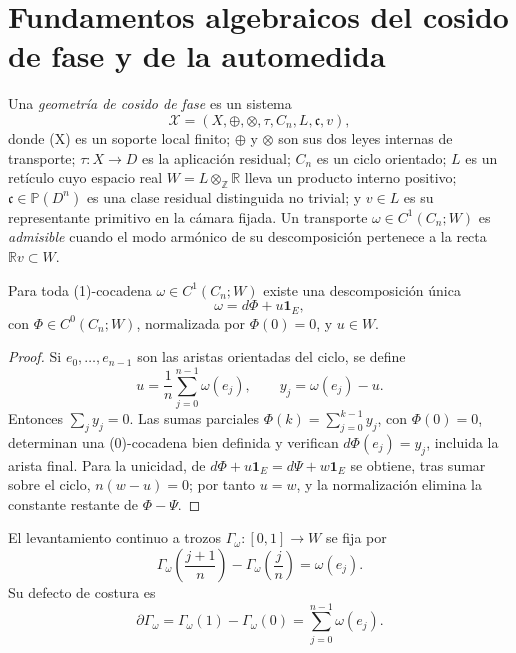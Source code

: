 \providecommand{\X}{\mathcal X}
\providecommand{\Acal}{\mathfrak a}
\providecommand{\bd}{\partial}
\providecommand{\oneE}{\mathbf 1_E}

\section{Fundamentos algebraicos del cosido de fase y de la automedida}

\begin{definition}
Una \emph{geometría de cosido de fase} es un sistema
\[
\X=(X,\oplus,\otimes,\tau,C_n,L,\mathfrak c,v),
\]
donde (X) es un soporte local finito; \(\oplus\) y \(\otimes\) son sus
dos leyes internas de transporte; \(\tau:X\to D\) es la aplicación residual;
\(C_n\) es un ciclo orientado; \(L\) es un retículo cuyo espacio real
\(W=L\otimes_{\mathbb Z}\mathbb R\) lleva un producto interno positivo;
\(\mathfrak c\in\mathbb P(D^n)\) es una clase residual distinguida no
trivial; y \(v\in L\) es su representante primitivo en la cámara fijada.
Un transporte \(\omega\in C^1(C_n;W)\) es \emph{admisible} cuando el modo
armónico de su descomposición pertenece a la recta
\(\mathbb Rv\subset W\).
\end{definition}

\begin{theorem}
\label{thm:hodge-cycle}
Para toda (1)-cocadena \(\omega\in C^1(C_n;W)\) existe una descomposición
única
\[
  \omega=d\Phi+u\oneE,
\]
con \(\Phi\in C^0(C_n;W)\), normalizada por \(\Phi(0)=0\), y \(u\in W\).
\end{theorem}

\begin{proof}
Si \(e_0,\ldots,e_{n-1}\) son las aristas orientadas del ciclo, se define
\[
 u=\frac1n\sum_{j=0}^{n-1}\omega(e_j),
 \qquad y_j=\omega(e_j)-u.
\]
Entonces \(\sum_jy_j=0\). Las sumas parciales
\(\Phi(k)=\sum_{j=0}^{k-1}y_j\), con \(\Phi(0)=0\), determinan una
(0)-cocadena bien definida y verifican \(d\Phi(e_j)=y_j\), incluida la
arista final. Para la unicidad, de
\(d\Phi+u\oneE=d\Psi+w\oneE\) se obtiene, tras sumar sobre el ciclo,
\(n(w-u)=0\); por tanto \(u=w\), y la normalización elimina la constante
restante de \(\Phi-\Psi\).
\end{proof}

\begin{definition}
El levantamiento continuo a trozos \(\Gamma_\omega:[0,1]\to W\) se fija por
\[
 \Gamma_\omega\!\left(\frac{j+1}{n}\right)
 -\Gamma_\omega\!\left(\frac jn\right)=\omega(e_j).
\]
Su defecto de costura es
\[
 \bd\Gamma_\omega
 =\Gamma_\omega(1)-\Gamma_\omega(0)
 =\sum_{j=0}^{n-1}\omega(e_j).
\]
\end{definition}

